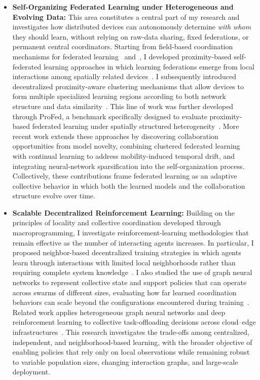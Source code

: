 \documentclass[10pt,a4paper,roman]{moderncv}        %
\newenvironment{cvprose}%
  {\begin{list}{}{%
     \setlength{\leftmargin}{\dimexpr\hintscolumnwidth+\separatorcolumnwidth\relax}%
     \setlength{\rightmargin}{0pt}%
     \setlength{\listparindent}{0pt}%
     \setlength{\itemindent}{0pt}%
     \setlength{\labelwidth}{0pt}%
     \setlength{\topsep}{.25em}%
     \setlength{\parsep}{.5em}%
     \setlength{\partopsep}{0pt}}%
   \item\relax}%
  {\end{list}}
\begin{document}
\begin{cvprose}
\begin{itemize}
\item \textbf{Self-Organizing Federated Learning under Heterogeneous and Evolving Data:}
This area constitutes a central part of my research 
 and investigates how distributed devices can autonomously determine \emph{with whom} they should learn, 
 without relying on raw-data sharing, fixed federations, or permanent central coordinators.
%
Starting from field-based coordination mechanisms for federated learning~ and~, 
 I developed proximity-based self-federated learning approaches in which learning federations emerge 
 from local interactions among spatially related devices~.
%
I subsequently introduced decentralized proximity-aware clustering mechanisms that allow devices 
 to form multiple specialized learning regions according to both network structure 
 and data similarity~.
%
This line of work was further developed through ProFed, 
 a benchmark specifically designed to evaluate proximity-based federated learning
 under spatially structured heterogeneity~.
%
More recent work extends these approaches by discovering collaboration opportunities from model novelty, 
 combining clustered federated learning with continual learning to address mobility-induced temporal drift,
  and integrating neural-network sparsification into the self-organization process.
%
Collectively, 
 these contributions frame federated learning as an adaptive collective behavior in which 
 both the learned models and the collaboration structure evolve over time.

\item \textbf{Scalable Decentralized Reinforcement Learning:}
Building on the principles of locality and collective coordination developed through macroprogramming, 
 I investigate reinforcement-learning methodologies that remain effective as the number 
 of interacting agents increases.
%
In particular, 
 I proposed neighbor-based decentralized training strategies in which agents learn through interactions 
 with limited local neighborhoods rather than requiring complete system knowledge~.
%
I also studied the use of graph neural networks to represent collective state and support policies 
 that can operate across swarms of different sizes, 
 evaluating how far learned coordination behaviors can scale beyond the configurations encountered 
 during training~.
%
Related work applies heterogeneous graph neural networks and deep reinforcement learning 
 to collective task-offloading decisions across cloud--edge infrastructures~.
%
This research investigates the trade-offs among centralized, independent, and neighborhood-based learning, 
 with the broader objective of enabling policies that rely only on local observations while remaining robust to variable population sizes, 
 changing interaction graphs, and large-scale deployment.
\end{itemize}
\end{cvprose}
\end{document}
